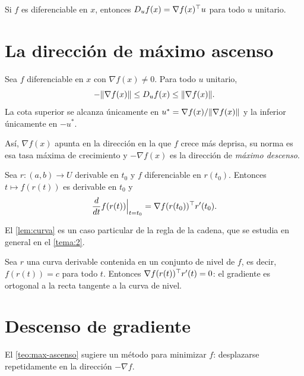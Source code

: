 \begin{proposicion}\label{prop:direccional}
Si $f$ es diferenciable en $x$, entonces $D_u f(x)=\nabla f(x)^{\top} u$ para todo $u$ unitario.
\end{proposicion}

\addtocounter{definicion}{1}%

\section{La dirección de máximo ascenso}

\begin{teorema}\label{teo:max-ascenso}
Sea $f$ diferenciable en $x$ con $\nabla f(x)\ne 0$. Para todo $u$ unitario,
\[
-\lVert\nabla f(x)\rVert\le D_u f(x)\le\lVert\nabla f(x)\rVert.
\]
La cota superior se alcanza únicamente en $u^{*}=\nabla f(x)/\lVert\nabla f(x)\rVert$ y la inferior únicamente en $-u^{*}$.
\end{teorema}

Así, $\nabla f(x)$ apunta en la dirección en la que $f$ crece más deprisa, su norma es esa tasa máxima de crecimiento y $-\nabla f(x)$ es la dirección de \emph{máximo descenso}.

\begin{lema}\label{lem:curva}
Sea $r\colon(a,b)\to U$ derivable en $t_0$ y $f$ diferenciable en $r(t_0)$. Entonces $t\mapsto f(r(t))$ es derivable en $t_0$ y
\[
\frac{d}{dt}f(r(t))\Big|_{t=t_0}=\nabla f(r(t_0))^{\top} r'(t_0).
\]
\end{lema}

El \cref{lem:curva} es un caso particular de la regla de la cadena, que se estudia en general en el \cref{tema:2}.

\begin{corolario}\label{cor:nivel}
Sea $r$ una curva derivable contenida en un conjunto de nivel de $f$, es decir, $f(r(t))=c$ para todo $t$. Entonces $\nabla f(r(t))^{\top} r'(t)=0$: el gradiente es ortogonal a la recta tangente a la curva de nivel.
\end{corolario}

\addtocounter{figure}{1}%

\section{Descenso de gradiente}

El \cref{teo:max-ascenso} sugiere un método para minimizar $f$: desplazarse repetidamente en la dirección $-\nabla f$.

